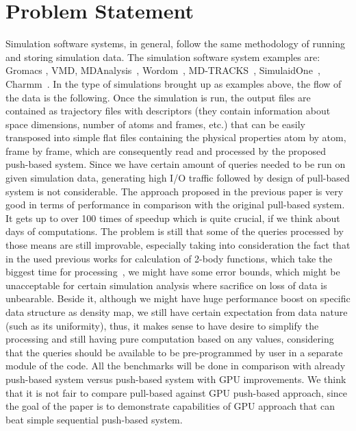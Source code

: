 \documentclass[12pt,letterpaper]{report}
\begin{document}
\section{Problem Statement}
\hspace{3em} Simulation software systems, in general, follow the same methodology of running and storing simulation data. The simulation software system examples are: Gromacs \cite{GROMACS4}, VMD\cite{VMD}, MDAnalysis~\cite{MDAnalysis}, Wordom~\cite{wordom}, MD-TRACKS~\cite{MDtracks}, SimulaidOne~\cite{Simulaid}, Charmm~\cite{CHARMM}. In the type of simulations brought up as examples above, the flow of the data is the following. Once the simulation is run, the output files are contained as trajectory files with descriptors (they contain information about space dimensions, number of atoms and frames, etc.) that can be easily transposed into simple flat files containing the physical properties atom by atom, frame by frame, which are consequently read and processed by the proposed push-based system. Since we have certain amount of queries needed to be run on given simulation data, generating high I/O traffic followed by design of pull-based system is not considerable. The approach proposed in the previous paper is very good in terms of performance in comparison with the original pull-based system\cite{mainPaper}. It gets up to over 100 times of speedup which is quite crucial, if we think about days of computations. The problem is still that some of the queries processed by those means are still improvable, especially taking into consideration the fact that in the used previous works for calculation of 2-body functions, which take the biggest time for processing~\cite{ytu:icde09, EDBT12}, we might have some error bounds, which might be unacceptable for certain simulation analysis where sacrifice on loss of data is unbearable. Beside it, although we might have huge performance boost on specific data structure as density map, we still have certain expectation from data nature (such as its uniformity), thus, it makes sense to have desire to simplify the processing and still having pure computation based on any values, considering that the queries should be available to be pre-programmed by user in a separate module of the code. All the benchmarks will be done in comparison with already push-based system versus push-based system with GPU improvements. We think that it is  not fair to compare pull-based against GPU push-based approach, since the goal of the paper is to demonstrate capabilities of GPU approach that can beat simple sequential push-based system.
\end{document}
